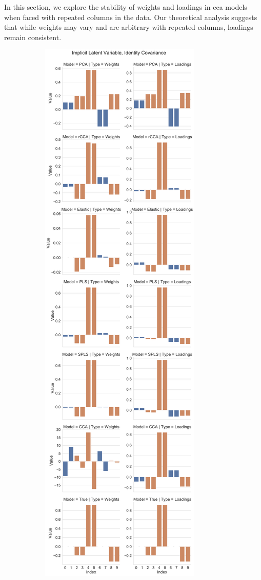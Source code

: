 In this section, we explore the stability of \gls{weights} and \gls{loadings} in \acrshort{cca} models when faced with repeated columns in the data.
Our theoretical analysis suggests that while \gls{weights} may vary and are arbitrary with repeated columns, \gls{loadings}  remain consistent.

\begin{figure}
\centering
\begin{subfigure}{0.49\linewidth}
\centering
\includegraphics[width=\linewidth]{figures/simulated/repeated/Combined_Weights_Loadings_with_Error_Bars_Identity_Covariance_implicit}

\end{subfigure}
\end{figure}
